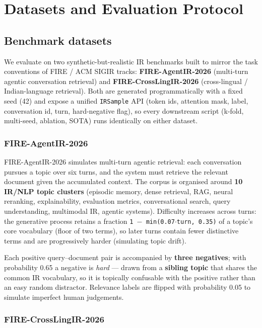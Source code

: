 \section{Datasets and Evaluation Protocol}
\label{sec:datasets}

\subsection{Benchmark datasets}
\label{sec:datasets-benchmarks}

We evaluate on two synthetic-but-realistic IR benchmarks built to mirror the task conventions of FIRE / ACM SIGIR tracks: \textbf{FIRE-AgentIR-2026} (multi-turn agentic conversation retrieval) and \textbf{FIRE-CrossLingIR-2026} (cross-lingual / Indian-language retrieval). Both are generated programmatically with a fixed seed (42) and expose a unified \texttt{IRSample} API (token ids, attention mask, label, conversation id, turn, hard-negative flag), so every downstream script (k-fold, multi-seed, ablation, SOTA) runs identically on either dataset.

\subsubsection{FIRE-AgentIR-2026}

FIRE-AgentIR-2026 simulates multi-turn agentic retrieval: each conversation pursues a topic over six turns, and the system must retrieve the relevant document given the accumulated context. The corpus is organised around \textbf{10 IR/NLP topic clusters} (episodic memory, dense retrieval, RAG, neural reranking, explainability, evaluation metrics, conversational search, query understanding, multimodal IR, agentic systems). Difficulty increases across turns: the generative process retains a fraction \texttt{1 $-$ min(0.07$\cdot$turn, 0.35)} of a topic's core vocabulary (floor of two terms), so later turns contain fewer distinctive terms and are progressively harder (simulating topic drift).

Each positive query--document pair is accompanied by \textbf{three negatives}; with probability 0.65 a negative is \emph{hard} --- drawn from a \textbf{sibling topic} that shares the common IR vocabulary, so it is topically confusable with the positive rather than an easy random distractor. Relevance labels are flipped with probability 0.05 to simulate imperfect human judgements.

\subsubsection{FIRE-CrossLingIR-2026}

